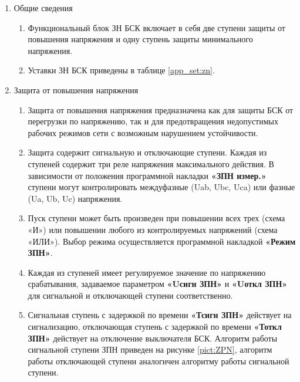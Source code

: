 \color{black}

\begin{enumerate}

\item Общие сведения
\begin{enumerate}

\item 
Функциональный блок ЗН БСК включает в себя две ступени защиты от повышения напряжения и одну ступень защиты минимального напряжения.

\item 
Уставки ЗН БСК приведены в таблице \ref{app_set:zn}.

\end{enumerate}

\item Защита от повышения напряжения 
\begin{enumerate}

\item
Защита от повышения напряжения предназначена как для защиты БСК от перегрузки по напряжению, так и для предотвращения недопустимых рабочих режимов сети с возможным нарушением устойчивости. 

\item
Защита содержит сигнальную и отключающие ступени. Каждая из ступеней содержит три реле напряжения максимального действия. В зависимости от положения программной накладки \textbf{«ЗПН измер.»} ступени могут контролировать междуфазные (Uab, Ubc, Uca) или фазные (Ua, Ub, Uc) напряжения. 

\item
Пуск ступени может быть произведен при повышении всех трех (схема «И») или повышении любого из контролируемых напряжений (схема «ИЛИ»). Выбор режима осуществляется программной накладкой \textbf{«Режим ЗПН»}. 

\item
Каждая из ступеней имеет регулируемое значение по напряжению срабатывания, задаваемое параметром \textbf{«Uсигн ЗПН»} и \textbf{«Uоткл ЗПН»} для сигнальной и отключающей ступени соответственно. 

\item
Сигнальная ступень с задержкой по времени \textbf{«Тсигн ЗПН»} действует на сигнализацию, отключающая ступень с задержкой по времени \textbf{«Тоткл ЗПН»} действует на отключение выключателя БСК. Алгоритм работы сигнальной ступени ЗПН приведен на рисунке \ref{pict:ZPN}, алгоритм работы отключающей ступени аналогичен алгоритму работы сигнальной ступени.


\end{enumerate}
\end{enumerate}
